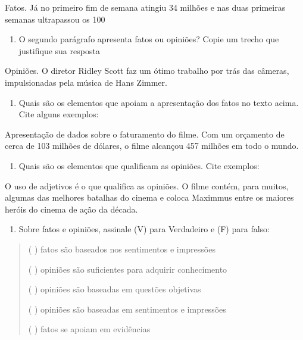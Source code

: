 {Fatos. Já no primeiro fim de semana atingiu 34 milhões e nas duas
primeiras semanas ultrapassou os 100

\begin{enumerate}
\def\labelenumi{\arabic{enumi})}
\setcounter{enumi}{5}
\tightlist
\item
  O segundo parágrafo apresenta fatos ou opiniões? Copie um trecho que
  justifique sua resposta
\end{enumerate}

Opiniões. O diretor Ridley Scott faz um ótimo trabalho por trás das
câmeras, impulsionadas pela música de Hans Zimmer.

\begin{enumerate}
\def\labelenumi{\arabic{enumi})}
\setcounter{enumi}{6}
\tightlist
\item
  Quais são os elementos que apoiam a apresentação dos fatos no texto
  acima. Cite alguns exemplos:
\end{enumerate}

Apresentação de dados sobre o faturamento do filme. Com um orçamento de
cerca de 103 milhões de dólares, o filme alcançou 457 milhões em todo o
mundo.

\begin{enumerate}
\def\labelenumi{\arabic{enumi})}
\setcounter{enumi}{7}
\tightlist
\item
  Quais são os elementos que qualificam as opiniões. Cite exemplos:
\end{enumerate}

O uso de adjetivos é o que qualifica as opiniões. O filme contém, para
muitos, algumas das melhores batalhas do cinema e coloca Maximmus entre
os maiores heróis do cinema de ação da década.

\begin{enumerate}
\def\labelenumi{\arabic{enumi})}
\setcounter{enumi}{8}
\tightlist
\item
  Sobre fatos e opiniões, assinale (V) para Verdadeiro e (F) para falso:
\end{enumerate}

\begin{quote}
( ) fatos são baseados nos sentimentos e impressões

( ) opiniões são suficientes para adquirir conhecimento

( ) opiniões são baseadas em questões objetivas

( ) opiniões são baseadas em sentimentos e impressões

( ) fatos se apoiam em evidências


\end{quote}}
